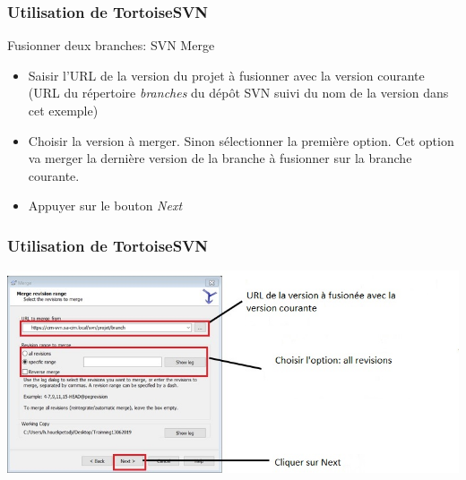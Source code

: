 \documentclass{beamer}
\begin{document}
\begin{frame}
\frametitle{Utilisation de TortoiseSVN}
\begin{block}{Fusionner deux branches: SVN Merge}
\begin{itemize}
\item Saisir l'URL de la version du projet à fusionner avec la version courante (URL du répertoire \alert{\textit{branches}}  du dépôt SVN suivi du nom de la version dans cet exemple)
\item Choisir la version à merger. Sinon sélectionner la première option. Cet option va merger la dernière version de la branche à fusionner sur la branche courante.
\item Appuyer sur le bouton \alert{\textit{Next}}
\end{itemize}
\end{block}
\end{frame}

\begin{frame}
\frametitle{Utilisation de TortoiseSVN}
\includegraphics[scale=.7]{../images/merge3.jpg}
\end{frame}
\end{document}
